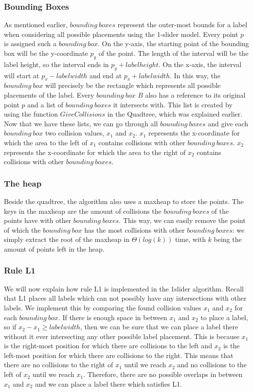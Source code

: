 \documentclass[crop=false,a4paper,oneside,11pt]{article}
\begin{document}
\subsubsection{Bounding Boxes}
As mentioned earlier, $bounding \ boxes$ represent the outer-most bounds for a label when considering all possible placements using the 1-slider model. Every point $p$ is assigned such a $bounding \ box$. On the y-axis, the starting point of the bounding box will be the y-coordinate $p_y$ of the point. The length of the interval will be the label height, so the interval ends in $p_y + labelheight$. On the x-axis, the interval will start at $p_x - labelwidth$ and end at $p_x+labelwidth$. In this way, the $bounding \ box$ will precisely be the rectangle which represents all possible placements of the label. Every $bounding \ box$ $B$ also has a reference to its original point $p$ and a list of $bounding \ boxes$ it intersects with. This list is created by using the function $GiveCollisions$ in the Quadtree, which was explained earlier. Now that we have these lists, we can go through all $bounding \ boxes$ and give each $bounding \ box$ two collision values, $x_1$ and $x_2$. $x_1$ represents the x-coordinate for which the area to the left of $x_1$ contains collisions with other $bounding \ boxes$. $x_2$ represents the x-coordinate for which the area to the right of $x_2$ contains collisions with other $bounding \ boxes$. 
\subsubsection{The heap}
Beside the quadtree, the algorithm also uses a maxheap to store the points. The keys in the maxheap are the amount of collisions the $bounding \ boxes$ of the points have with other $bounding \ boxes$. This way, we can easily remove the point of which the $bounding \ box$ has the most collisions with other $bounding \ boxes$: we simply extract the root of the maxheap in $\Theta(log (k))$ time, with $k$ being the amount of points left in the heap. 
\subsubsection{Rule L1}
We will now explain how rule L1 is implemented in the 1slider algorithm. Recall that L1 places all labels which can not possibly have any intersections with other labels. We implement this by comparing the found collision values $x_1$ and $x_2$ for each $bounding \ box$. If there is enough space in between $x_1$ and $x_2$ to place a label, so if $x_2 - x_1 \geq labelwidth$, then we can be sure that we can place a label there without it ever intersecting any other possible label placement. This is because $x_1$ is the right-most position for which there are collisions to the left and $x_2$ is the left-most position for which there are collisions to the right. This means that there are no collisions to the right of $x_1$ until we reach $x_2$ and no collisions to the left of $x_2$ until we reach $x_1$. Therefore, there are no possible overlaps in between $x_1$ and $x_2$ and we can place a label there which satisfies L1.
\end{document}
